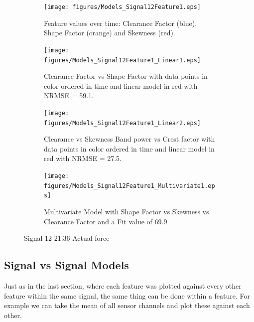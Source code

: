 \documentclass[]{article}
\begin{document}
\begin{figure}[H]
	\captionsetup[subfigure]{}
    \centering
    
		\begin{subfigure}[t]{.45\textwidth}
		  \centering
    			\texttt{[image: figures/Models\_Signal12Feature1.eps]}
		  	\caption{Feature values over time: Clearance Factor (blue), Shape Factor (orange) and Skewness (red).}
		  	\label{fig:Models_Signal12Feature1}
		\end{subfigure}
		\hspace*{\fill}%
		\begin{subfigure}[t]{.45\textwidth}
		  \centering
 		   	\texttt{[image: figures/Models\_Signal12Feature1\_Linear1.eps]}
		  	\caption{Clearance Factor vs Shape Factor with data points in color ordered in time and linear model in red with \gls{NRMSE} = 59.1.}
		  	\label{fig:Models_Signal12Feature1_Linear1}
		\end{subfigure}
		\bigskip
		\begin{subfigure}[t]{.45\textwidth}
		  \centering
 		   	\texttt{[image: figures/Models\_Signal12Feature1\_Linear2.eps]}
		  	\caption{Clearance vs Skewness Band power vs Crest factor with data points in color ordered in time and linear model in red with \gls{NRMSE} = 27.5.}
		  	\label{fig:Models_Signal12Feature1_Linear2}
		\end{subfigure}
		\hspace*{\fill}%
		\begin{subfigure}[t]{.45\textwidth}
		  \centering
 		   	\texttt{[image: figures/Models\_Signal12Feature1\_Multivariate1.eps]}
		  	\caption{Multivariate Model with Shape Factor vs Skewness vs Clearance Factor and a Fit value of 69.9.}
		  	\label{fig:Models_Signal12Feature1_Multivariate1}
		\end{subfigure}
		
    \caption{Signal 12 21:36 Actual force}
    \label{fig:Models_Signal12Feature1_Caption}
\end{figure}



\subsection{Signal vs Signal Models}
Just as in the last section, where each feature was plotted against every other feature within the same signal, the same thing can be done within a feature. For example we can take the mean of all sensor channels and plot these against each other.
\end{document}
